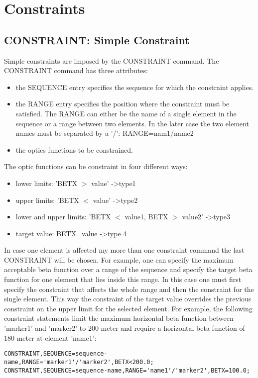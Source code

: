  
\section{Constraints}

\subsection{CONSTRAINT: Simple Constraint}

Simple constraints are imposed by the CONSTRAINT command. The CONSTRAINT
command has three attributes:   
\begin{itemize}
	\item  the SEQUENCE entry specifies the sequence for which the
          constraint applies.  
	\item  the RANGE entry specifies the position where the
          constraint must be satisfied. The RANGE can either be the name
          of a single element in the sequence or a range between two
          elements. In the later case the two element names must be
          separated by a '/': RANGE=nam1/name2  
	\item the optics functions to be constrained. 
\end{itemize} 

The optic functions can be constraint in four different ways: 
\begin{itemize}
	\item lower limits: 'BETX $>$ value' -\textgreater type1 
	\item upper limits: 'BETX $<$ value' -\textgreater type2 
	\item lower and upper limits: 'BETX $<$ value1, 
          BETX $>$ value2' -\textgreater type3  
	\item target value: BETX=value -\textgreater type 4 
\end{itemize} 

In case one element is affected my more than one constraint command the
last  CONSTRAINT will be chosen. For example, one can specify the
maximum acceptable beta function over a range of the sequence and
specify the target beta  function for one element that lies inside this
range. In this case one must first specify the constraint that affects
the whole range and then the constraint for the single element. This way
the constraint of the target value overrides the previous constraint on
the upper limit for the selected element. For example, the following
constraint statements limit the maximum horizontal beta function between
'marker1' and 'marker2' to 200 meter and require a horizontal beta
function of 180 meter at element 'name1':  
\begin{verbatim}
CONSTRAINT,SEQUENCE=sequence-name,RANGE='marker1'/'marker2',BETX<200.0;
CONSTRAINT,SEQUENCE=sequence-name,RANGE='name1'/'marker2',BETX=100.0;
\end{verbatim}

